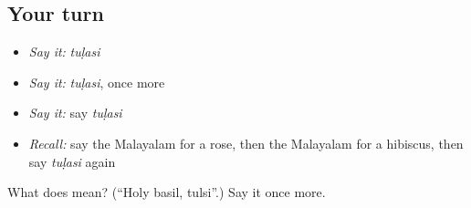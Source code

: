 \subsection*{Your turn}
\begin{itemize}
\raggedright
  \item \emph{Say it:} \emph{tuḷasi}
  \item \emph{Say it:} \emph{tuḷasi}, once more
  \item \emph{Say it:} say \emph{tuḷasi}
  \item \emph{Recall:} say the Malayalam for a rose, then the Malayalam for a hibiscus, then say \emph{tuḷasi} again
\end{itemize}

\begin{tcolorbox}[breakable,colback=teal!4,colframe=teal!35!black,title={Before you move on}]
What does  mean? (\textquotedblleft{}Holy basil, tulsi\textquotedblright{}.) Say it once more.
\end{tcolorbox}
